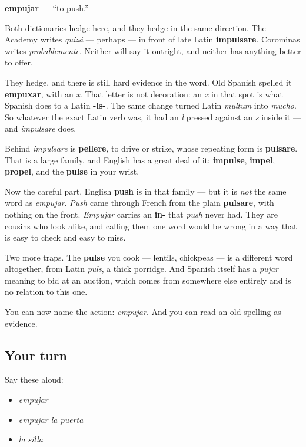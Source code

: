 \begin{cousinweb}
\textbf{empujar} — \textquotedblleft{}to push.\textquotedblright{}

Both dictionaries hedge here, and they hedge in the same direction. The Academy writes \emph{quizá} — perhaps — in front of late Latin \textbf{impulsare}. Corominas writes \emph{probablemente}. Neither will say it outright, and neither has anything better to offer.

They hedge, and there is still hard evidence in the word. Old Spanish spelled it \textbf{empuxar}, with an \emph{x}. That letter is not decoration: an \emph{x} in that spot is what Spanish does to a Latin \textbf{-ls-}. The same change turned Latin \emph{multum} into \emph{mucho}. So whatever the exact Latin verb was, it had an \emph{l} pressed against an \emph{s} inside it — and \emph{impulsare} does.

Behind \emph{impulsare} is \textbf{pellere}, to drive or strike, whose repeating form is \textbf{pulsare}. That is a large family, and English has a great deal of it: \textbf{impulse}, \textbf{impel}, \textbf{propel}, and the \textbf{pulse} in your wrist.

Now the careful part. English \textbf{push} is in that family — but it is \emph{not} the same word as \emph{empujar}. \emph{Push} came through French from the plain \textbf{pulsare}, with nothing on the front. \emph{Empujar} carries an \textbf{in-} that \emph{push} never had. They are cousins who look alike, and calling them one word would be wrong in a way that is easy to check and easy to miss.

Two more traps. The \textbf{pulse} you cook — lentils, chickpeas — is a different word altogether, from Latin \emph{puls}, a thick porridge. And Spanish itself has a \emph{pujar} meaning to bid at an auction, which comes from somewhere else entirely and is no relation to this one.
\end{cousinweb}

\begin{grammarlens}[title={What you've built}]
You can now name the action: \emph{empujar}. And you can read an old spelling as evidence.
\end{grammarlens}

\subsection*{Your turn}
Say these aloud:

\begin{itemize}
\raggedright
  \item \emph{empujar}
  \item \emph{empujar la puerta}
  \item \emph{la silla}
\end{itemize}

